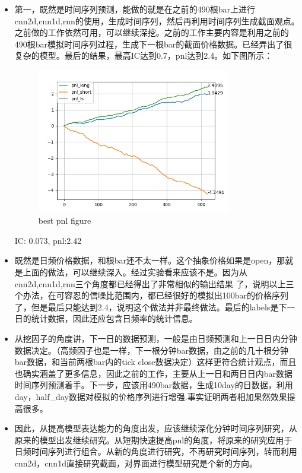 \documentclass[11pt]{ctexart}
\begin{document}
\begin{itemize}
  \item [1)]
  第一，既然是时间序列预测，能做的就是在之前的490根bar上进行cnn2d,cnn1d,rnn的使用，生成时间序列，然后再利用时间序列生成截面观点。之前做的工作依然可用，可以继续深挖。之前的工作主要内容是利用之前的490根bar模拟时间序列过程，生成下一根bar的截面价格数据。已经弄出了很复杂的模型。最后的结果，最高IC达到0.7，pnl达到2.4。如下图所示：
  
    \begin{figure}[htbp]
    \begin{center}
    \includegraphics[width=0.8\textwidth]{2.4.PNG}
    \end{center}
    \caption{best pnl figure}
    \label{FIG.1}
    \end{figure}

    {\kaishu \small IC: 0.073, pnl:2.42}
  \item [2)]
  既然是日频价格数据，和根bar还不太一样。这个抽象价格如果是open，那就是上面的做法，可以继续深入。经过实验看来应该不是。因为从cnn2d,cnn1d,rnn三个角度都已经得出了非常相似的输出结果 了，说明以上三个办法，在可容忍的信噪比范围内，都已经很好的模拟出100bar的价格序列了，但是最后只能达到2.4，说明这个做法并非最终做法。最后的labels是下一日的统计数据，因此还应包含日频率的统计信息。
  \item [3)]
  从挖因子的角度讲，下一日的数据预测，一般是由日频预测和上一日日内分钟数据决定。（高频因子也是一样，下一根分钟bar数据，由之前的几十根分钟bar数据，和当前两根bar内的tick close数据决定）这样更符合统计观点，而且也确实涵盖了更多信息，因此之前的工作，主要从上一日和两日日内bar数据时间序列预测着手。下一步，应该用490bar数据，生成10day的日数据，利用day，half\_day数据对模拟的价格序列进行增强.事实证明两者相加果然效果提高很多。
  \item [4)]
  因此，从提高模型表达能力的角度出发，应该继续深化分钟时间序列研究，从原来的模型出发继续研究。从短期快速提高pnl的角度，将原来的研究应用于日频时间序列进行组合。从新的角度进行研究，不再研究时间序列，转而利用cnn2d，cnn1d直接研究截面，对界面进行模型研究是个新的方向。

\end{itemize}
\end{document}
